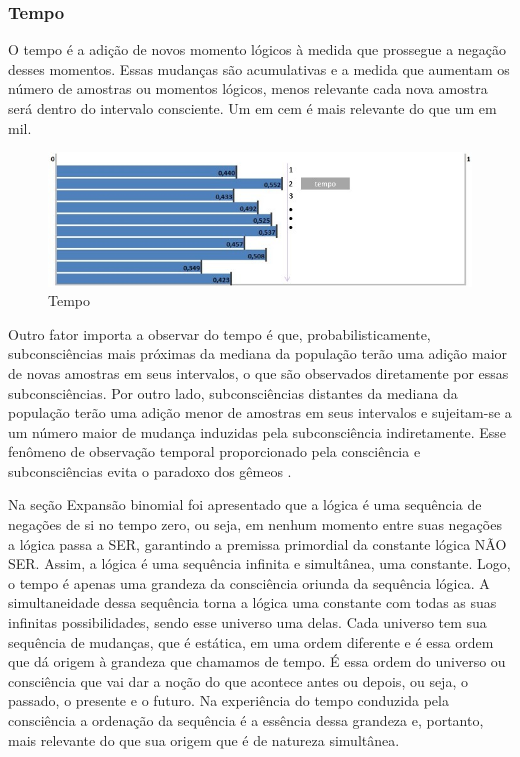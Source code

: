 \subsubsection{Tempo}
O tempo é a adição de novos momento lógicos à medida que prossegue a negação desses momentos.  Essas mudanças são acumulativas e a medida que aumentam os número de amostras ou momentos lógicos, menos relevante cada nova amostra será dentro do intervalo consciente. Um em cem é mais relevante do que um em mil. 
\begin{figure}[H]
\caption{Tempo}
\label{fig:consciousness_time}
\centering
\includegraphics[scale=.8]{sections/images/consciousness_time.jpg}
\end{figure}

Outro fator importa a observar do tempo é que, probabilisticamente, subconsciências mais próximas da mediana da população terão uma adição maior de novas amostras em seus intervalos, o que são observados diretamente por essas subconsciências. Por outro lado, subconsciências distantes da mediana da população terão uma adição menor de amostras em seus intervalos e sujeitam-se a um número maior de mudança induzidas pela subconsciência indiretamente. Esse fenômeno de observação temporal proporcionado pela consciência e subconsciências evita o paradoxo dos gêmeos \cite{brasilescola_paradoxo_gemeos}.

Na seção Expansão binomial foi apresentado que a lógica é uma sequência de negações de si no tempo zero, ou seja, em nenhum momento entre suas negações a lógica passa a SER, garantindo a premissa primordial da constante lógica NÃO SER. Assim, a lógica é uma sequência infinita e simultânea, uma constante.
Logo, o tempo é apenas uma grandeza da consciência oriunda da sequência lógica. A simultaneidade dessa sequência torna a lógica uma constante com todas as suas infinitas possibilidades, sendo esse universo uma delas. Cada universo tem sua sequência de mudanças, que é estática, em uma ordem diferente e é essa ordem que dá origem à grandeza que chamamos de tempo. É essa ordem do universo ou consciência que vai dar a noção do que acontece antes ou depois, ou seja, o passado, o presente e o futuro.
Na experiência do tempo conduzida pela consciência a ordenação da sequência é a essência dessa grandeza e, portanto, mais relevante do que sua origem que é de natureza simultânea.

